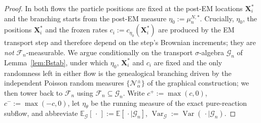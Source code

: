 \documentclass[a4paper,fleqn]{cas-sc}
\theoremstyle{definition}
\theoremstyle{remark}
\begin{document}
\begin{proof}
In both flows the particle positions are fixed at the post-EM locations
$\mathbf X^*_i$ and the branching starts from the post-EM measure
$\eta_0:=\mu^{N,*}_n$. Crucially, $\eta_0$, the positions $\mathbf X^*_i$ and the
frozen rates $c_i:=c_{\eta_0}(\mathbf X^*_i)$ are produced by the EM transport step
and therefore depend on the step's Brownian increments; they are \emph{not}
$\mathcal F_n$-measurable. We argue conditionally on the transport
$\sigma$-algebra $\mathcal G_n$ of Lemma~\ref{lem:Bstab}, under which $\eta_0$,
$\mathbf X^*_i$ and $c_i$ are fixed and the only randomness left in either flow is
the genealogical branching driven by the independent Poisson random measures
$\{\mathcal N^\pm_\alpha\}$ of the graphical construction; we then tower back to
$\mathcal F_n$ using $\mathcal F_n\subseteq\mathcal G_n$. Write $c^+:=\max(c,0)$,
$c^-:=\max(-c,0)$, let $\eta_\theta$ be the running measure of the exact
pure-reaction subflow, and abbreviate
$\mathbb E_{\mathcal G}[\,\cdot\,]:=\mathbb E[\,\cdot\mid\mathcal G_n]$,
$\operatorname{Var}_{\mathcal G}:=\operatorname{Var}(\,\cdot\mid\mathcal G_n)$.


\end{proof}
\end{document}
